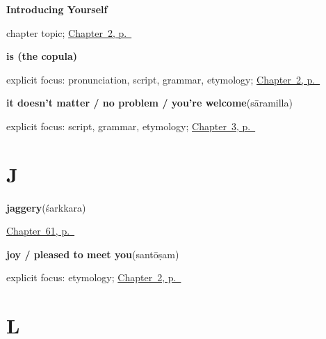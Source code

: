 \noindent\begin{minipage}[t]{\linewidth}
\raggedright
\textbf{Introducing Yourself}\par
\footnotesize chapter topic; \hyperref[ch:introductions]{Chapter~2, p.~\pageref*{ch:introductions}}
\end{minipage}\par\smallskip

\noindent\begin{minipage}[t]{\linewidth}
\raggedright
\textbf{is (the copula)}\enspace\emph{}\par
\footnotesize explicit focus: pronunciation, script, grammar, etymology; \hyperref[ch:introductions]{Chapter~2, p.~\pageref*{ch:introductions}}
\end{minipage}\par\smallskip

\noindent\begin{minipage}[t]{\linewidth}
\raggedright
\textbf{it doesn't matter / no problem / you're welcome}\enspace\emph{}\enspace(sāramilla)\par
\footnotesize explicit focus: script, grammar, etymology; \hyperref[ch:responding]{Chapter~3, p.~\pageref*{ch:responding}}
\end{minipage}\par\smallskip

\section*{J}

\noindent\begin{minipage}[t]{\linewidth}
\raggedright
\textbf{jaggery}\enspace\emph{}\enspace(śarkkara)\par
\footnotesize \hyperref[ch:ml-on-the-kitchen-shelf]{Chapter~61, p.~\pageref*{ch:ml-on-the-kitchen-shelf}}
\end{minipage}\par\smallskip

\noindent\begin{minipage}[t]{\linewidth}
\raggedright
\textbf{joy / pleased to meet you}\enspace\emph{}\enspace(santōṣam)\par
\footnotesize explicit focus: etymology; \hyperref[ch:introductions]{Chapter~2, p.~\pageref*{ch:introductions}}
\end{minipage}\par\smallskip

\section*{L}

